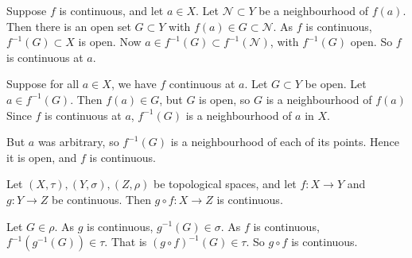 \documentclass[12pt]{article}
\begin{document}
\begin{proofbox}
	Suppose $f$ is continuous, and let $a \in X$. Let $\mathcal{N} \subset Y$ be a neighbourhood of $f(a)$. Then there is an open set $G \subset Y$ with $f(a) \in G \subset \mathcal{N}$. As $f$ is continuous, $f^{-1}(G) \subset X$ is open. Now $a \in f^{-1}(G) \subset f^{-1}(\mathcal{N})$, with $f^{-1}(G)$ open. So $f$ is continuous at $a$.

	Suppose for all $a \in X$, we have $f$ continuous at $a$. Let $G \subset Y$ be open. Let $a \in f^{-1}(G)$. Then $f(a) \in G$, but $G$ is open, so $G$ is a neighbourhood of $f(a)$ Since $f$ is continuous at $a$, $f^{-1}(G)$ is a neighbourhood of $a$ in $X$.

	But $a$ was arbitrary, so $f^{-1}(G)$ is a neighbourhood of each of its points. Hence it is open, and $f$ is continuous.
\end{proofbox}

\begin{proposition}
	Let $(X, \tau), (Y, \sigma), (Z, \rho)$ be topological spaces, and let $f : X \to Y$ and $g : Y \to Z$ be continuous. Then $g \circ f : X \to Z$ is continuous.
\end{proposition}

\begin{proofbox}
	Let $G \in \rho$. As $g$ is continuous, $g^{-1}(G) \in \sigma$. As $f$ is continuous, $f^{-1}(g^{-1}(G)) \in \tau$. That is $(g \circ f)^{-1}(G) \in \tau$. So $g \circ f$ is continuous.
\end{proofbox}
\end{document}
